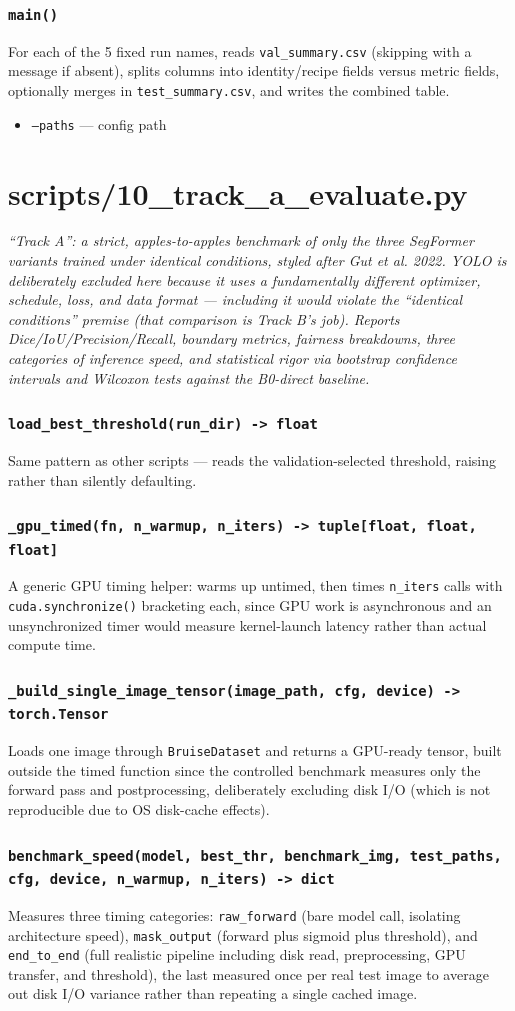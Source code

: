 \documentclass[11pt]{article}
\newcommand{\role}[1]{\par\noindent\textit{#1}\par\vspace{0.5em}}
\newcommand{\func}[1]{\subsubsection*{\texttt{#1}}}
\newcommand{\cliarg}[2]{\item \texttt{#1} --- #2}
\begin{document}
\func{main()}
For each of the 5 fixed run names, reads \texttt{val\_summary.csv} (skipping
with a message if absent), splits columns into identity/recipe fields versus
metric fields, optionally merges in \texttt{test\_summary.csv}, and writes the
combined table.

\begin{itemize}[nosep]
\cliarg{--paths}{config path}
\end{itemize}

\section{scripts/10\_track\_a\_evaluate.py}
\role{``Track A'': a strict, apples-to-apples benchmark of only the three
SegFormer variants trained under identical conditions, styled after Gut et
al. 2022. YOLO is deliberately excluded here because it uses a fundamentally
different optimizer, schedule, loss, and data format --- including it would
violate the ``identical conditions'' premise (that comparison is Track B's
job). Reports Dice/IoU/Precision/Recall, boundary metrics, fairness breakdowns,
three categories of inference speed, and statistical rigor via bootstrap
confidence intervals and Wilcoxon tests against the B0-direct baseline.}

\func{load\_best\_threshold(run\_dir) -> float}
Same pattern as other scripts --- reads the validation-selected threshold,
raising rather than silently defaulting.

\func{\_gpu\_timed(fn, n\_warmup, n\_iters) -> tuple[float, float, float]}
A generic GPU timing helper: warms up untimed, then times \texttt{n\_iters}
calls with \texttt{cuda.synchronize()} bracketing each, since GPU work is
asynchronous and an unsynchronized timer would measure kernel-launch latency
rather than actual compute time.

\func{\_build\_single\_image\_tensor(image\_path, cfg, device) -> torch.Tensor}
Loads one image through \texttt{BruiseDataset} and returns a GPU-ready tensor,
built outside the timed function since the controlled benchmark measures only
the forward pass and postprocessing, deliberately excluding disk I/O (which is
not reproducible due to OS disk-cache effects).

\func{benchmark\_speed(model, best\_thr, benchmark\_img, test\_paths, cfg, device, n\_warmup, n\_iters) -> dict}
Measures three timing categories: \texttt{raw\_forward} (bare model call,
isolating architecture speed), \texttt{mask\_output} (forward plus sigmoid plus
threshold), and \texttt{end\_to\_end} (full realistic pipeline including disk
read, preprocessing, GPU transfer, and threshold), the last measured once per
real test image to average out disk I/O variance rather than repeating a
single cached image.
\end{document}
